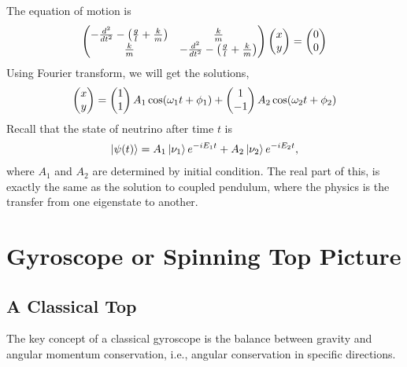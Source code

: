 \documentclass[letterpaper,12pt,english]{sphinxmanual}
\newcommand{\ket}[1]{\left| #1\right\rangle}
\begin{document}
The equation of motion is
\begin{gather}
\begin{split}\begin{pmatrix}-\frac{d^2}{dt^2} - \left(\frac{g}{l}+\frac{k}{m}\right) & \frac{k}{m} \\ \frac{k}{m} & -\frac{d^2}{dt^2} - \left(\frac{g}{l}+\frac{k}{m}\right)\end{pmatrix} \begin{pmatrix} x \\ y \end{pmatrix} = \begin{pmatrix} 0 \\ 0 \end{pmatrix}\end{split}\notag
\end{gather}
Using Fourier transform, we will get the solutions,
\begin{gather}
\begin{split}\begin{pmatrix} x \\ y \end{pmatrix} = \begin{pmatrix}1 \\ 1 \end{pmatrix}A_1 \cos(\omega_1 t + \phi_1) + \begin{pmatrix}1 \\ -1\end{pmatrix} A_2 \cos (\omega_2 t + \phi_2)\end{split}\notag
\end{gather}
Recall that the state of neutrino after time \(t\) is
\begin{gather}
\begin{split}\ket{\psi(t)} = A_1 \ket{\nu_1} e^{-i E_1 t} + A_2 \ket{\nu_2} e^{- i E_2 t},\end{split}\notag
\end{gather}
where \(A_1\) and \(A_2\) are determined by initial condition. The real part of this, is exactly the same as the solution to coupled pendulum, where the physics is the transfer from one eigenstate to another.


\section{Gyroscope or Spinning Top Picture}
\label{picture:gyroscope-or-spinning-top-picture}

\subsection{A Classical Top}
\label{picture:a-classical-top}
The key concept of a classical gyroscope is the balance between gravity and angular momentum conservation, i.e., angular conservation in specific directions.
\end{document}
